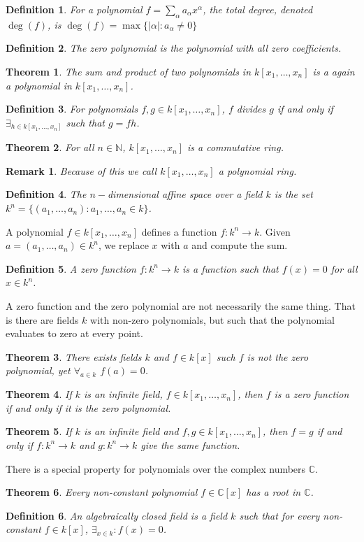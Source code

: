 \documentclass{article}
\theoremstyle{mystyle}
\newtheorem{theorem}{Theorem}[section]
\newtheorem{definition}{Definition}[section]
\newtheorem{remark}{Remark}[section]
\begin{document}
\begin{definition}
For a polynomial $f=\sum_{\alpha}a_\alpha x^\alpha$, the total degree, denoted $\deg(f)$, is $\deg(f) = \max\{|\alpha|:a_\alpha \ne 0\}$
\end{definition}
\begin{definition}
The zero polynomial is the polynomial with all zero coefficients.
\end{definition}
\begin{theorem}
The sum and product of two polynomials in $k[x_1,\hdots ,x_n]$ is a again a polynomial in $k[x_1,\hdots ,x_n]$.
\end{theorem}
\begin{definition}
For polynomials $f,g\in k[x_1,\hdots ,x_n]$, $f$ divides $g$ if and only if $\exists_{h\in k[x_1,\hdots ,x_n]}$ such that $g = fh$.
\end{definition}
\begin{theorem}
For all $n\in \mathbb{N}$, $k[x_1,\hdots ,x_n]$ is a commutative ring.
\end{theorem}
\begin{remark}
Because of this we call $k[x_1,\hdots ,x_n]$ a polynomial ring.
\end{remark}
\begin{definition}
The $n-$dimensional affine space over a field $k$ is the set $k^n = \{(a_1,\hdots, a_n):a_1,\hdots,a_n \in k\}$.
\end{definition}
A polynomial $f\in k[x_1,\hdots ,x_n]$ defines a function $f:k^n \rightarrow k$. Given $a=(a_1,\hdots, a_n) \in k^n$, we replace $x$ with $a$ and compute the sum. 
\begin{definition}
A zero function $f:k^n \rightarrow k$ is a function such that $f(x) = 0$ for all $x\in k^n$.
\end{definition}
A zero function and the zero polynomial are not necessarily the same thing. That is there are fields $k$ with non-zero polynomials, but such that the polynomial evaluates to zero at every point.
\begin{theorem}
There exists fields $k$ and $f\in k[x]$ such $f$ is not the zero polynomial, yet $\forall_{a\in k}$ $f(a) = 0$.
\end{theorem}
\begin{theorem}
If $k$ is an infinite field, $f\in k[x_1,\hdots ,x_n]$, then $f$ is a zero function if and only if it is the zero polynomial.
\end{theorem}
\begin{theorem}
If $k$ is an infinite field and $f,g\in k[x_1,\hdots ,x_n]$, then $f=g$ if and only if $f:k^n\rightarrow k$ and $g:k^n \rightarrow k$ give the same function.
\end{theorem}
There is a special property for polynomials over the complex numbers $\mathbb{C}$.
\begin{theorem}
Every non-constant polynomial $f\in \mathbb{C}[x]$ has a root in $\mathbb{C}$.
\end{theorem}
\begin{definition}
An algebraically closed field is a field $k$ such that for every non-constant $f\in k[x]$, $\exists_{x\in k}: f(x)=0$.
\end{definition}
\end{document}
